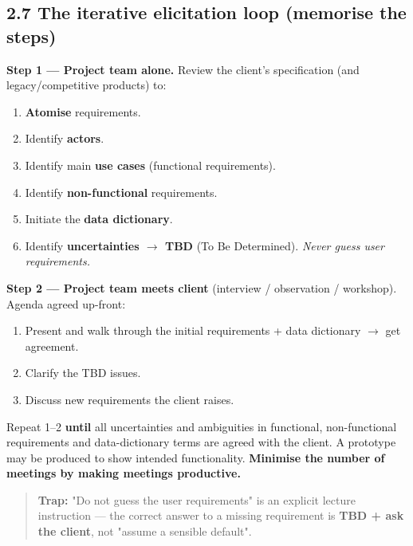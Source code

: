 \begin{studycolumns}
\begin{quote}
\end{quote}
\subsection*{2.7 The iterative elicitation loop (memorise the steps)}
\textbf{Step 1 --- Project team alone.} Review the client's specification (and legacy/\allowbreak{}competitive products) to:

\begin{enumerate}
\item \textbf{Atomise} requirements.
\item Identify \textbf{actors}.
\item Identify main \textbf{use cases} (functional requirements).
\item Identify \textbf{non-functional} requirements.
\item Initiate the \textbf{data dictionary}.
\item Identify \textbf{uncertainties \ensuremath{\rightarrow} TBD} (To Be Determined). \emph{Never guess user requirements.}
\end{enumerate}
\textbf{Step 2 --- Project team meets client} (interview /\allowbreak{} observation /\allowbreak{} workshop). Agenda agreed up-front:

\begin{enumerate}
\item Present and walk through the initial requirements + data dictionary \ensuremath{\rightarrow} get agreement.
\item Clarify the TBD issues.
\item Discuss new requirements the client raises.
\end{enumerate}
Repeat 1--2 \textbf{until} all uncertainties and ambiguities in functional, non-functional requirements and data-dictionary terms are agreed with the client. A prototype may be produced to show intended functionality. \textbf{Minimise the number of meetings by making meetings productive.}


\begin{quote}\small\color{navy}
\textbf{Trap:} "Do not guess the user requirements" is an explicit lecture instruction --- the correct answer to a missing requirement is \textbf{TBD + ask the client}, not "assume a sensible default".

\end{quote}
\end{studycolumns}

